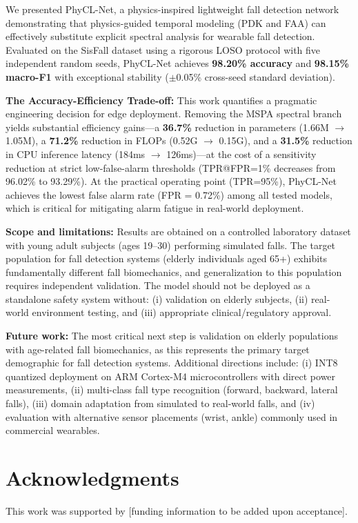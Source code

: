 \documentclass{article}
\begin{document}
We presented PhyCL-Net, a physics-inspired lightweight fall detection network demonstrating that physics-guided temporal modeling (PDK and FAA) can effectively substitute explicit spectral analysis for wearable fall detection. Evaluated on the SisFall dataset using a rigorous LOSO protocol with five independent random seeds, PhyCL-Net achieves \textbf{98.20\% accuracy} and \textbf{98.15\% macro-F1} with exceptional stability ($\pm$0.05\% cross-seed standard deviation).

\textbf{The Accuracy-Efficiency Trade-off:} This work quantifies a pragmatic engineering decision for edge deployment. Removing the MSPA spectral branch yields substantial efficiency gains---a \textbf{36.7\%} reduction in parameters (1.66M $\to$ 1.05M), a \textbf{71.2\%} reduction in FLOPs (0.52G $\to$ 0.15G), and a \textbf{31.5\%} reduction in CPU inference latency (184ms $\to$ 126ms)---at the cost of a sensitivity reduction at strict low-false-alarm thresholds (TPR@FPR=1\% decreases from 96.02\% to 93.29\%). At the practical operating point (TPR=95\%), PhyCL-Net achieves the lowest false alarm rate (FPR = 0.72\%) among all tested models, which is critical for mitigating alarm fatigue in real-world deployment.

\textbf{Scope and limitations:} Results are obtained on a controlled laboratory dataset with young adult subjects (ages 19--30) performing simulated falls. The target population for fall detection systems (elderly individuals aged 65+) exhibits fundamentally different fall biomechanics, and generalization to this population requires independent validation. The model should not be deployed as a standalone safety system without: (i) validation on elderly subjects, (ii) real-world environment testing, and (iii) appropriate clinical/regulatory approval.

\textbf{Future work:} The most critical next step is validation on elderly populations with age-related fall biomechanics, as this represents the primary target demographic for fall detection systems. Additional directions include: (i) INT8 quantized deployment on ARM Cortex-M4 microcontrollers with direct power measurements, (ii) multi-class fall type recognition (forward, backward, lateral falls), (iii) domain adaptation from simulated to real-world falls, and (iv) evaluation with alternative sensor placements (wrist, ankle) commonly used in commercial wearables.

\section*{Acknowledgments}
This work was supported by [funding information to be added upon acceptance].



\end{document}
